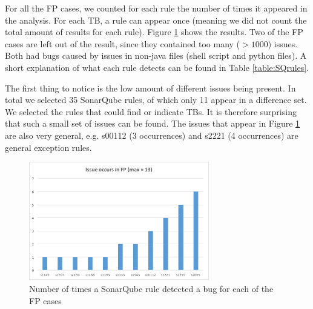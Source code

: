 \documentclass{uvamscse}
\begin{document}
For all the FP cases, we counted for each rule the number of times it appeared in the analysis. For each TB, a rule can appear once (meaning we did not count the total amount of results for each rule). Figure \ref{fig:SQRulesForFP} shows the results. Two of the FP cases are left out of the result, since they contained too many ($> 1000$) issues. Both had bugs caused by issues in non-java files (shell script and python files). A short explanation of what each rule detects can be found in Table \ref{table:SQrules}.

The first thing to notice is the low amount of different issues being present. In total we selected 35 SonarQube rules, of which only 11 appear in a difference set. We selected the rules that could find or indicate TBs. It is therefore surprising that such a small set of issues can be found. The issues that appear in Figure \ref{fig:SQRulesForFP} are also very general, e.g. s00112 (3 occurrences) and s2221 (4 occurrences) are general exception rules. 

\begin{figure}[!ht]
	\centering
	\includegraphics[width=0.7\textwidth]{figures/SQIssuesInFP.png}
	\caption{Number of times a SonarQube rule detected a bug for each of the FP cases}
	\label{fig:SQRulesForFP}
\end{figure}
\end{document}
